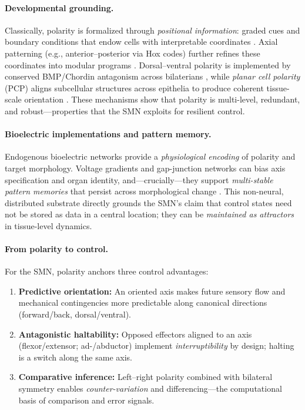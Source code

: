 \paragraph{Developmental grounding.}
Classically, polarity is formalized through \emph{positional information}: graded cues and boundary conditions that endow cells with interpretable coordinates \cite{Wolpert1969PositionalInformation}.
Axial patterning (e.g., anterior--posterior via Hox codes) further refines these coordinates into modular programs \cite{McGinnisKrumlauf1992Hox}.
Dorsal--ventral polarity is implemented by conserved BMP/Chordin antagonism across bilaterians \cite{DeRobertisSasai1996CommonPlan}, while \emph{planar cell polarity} (PCP) aligns subcellular structures across epithelia to produce coherent tissue-scale orientation \cite{GoodrichStrutt2011PCP}.
These mechanisms show that polarity is multi-level, redundant, and robust---properties that the SMN exploits for resilient control.

\paragraph{Bioelectric implementations and pattern memory.}
Endogenous bioelectric networks provide a \emph{physiological encoding} of polarity and target morphology.
Voltage gradients and gap-junction networks can bias axis specification and organ identity, and---crucially---they support \emph{multi-stable pattern memories} that persist across morphological change \cite{Levin2012MorphogeneticFields,Levin2014MolecularBioelectricity}.
This non-neural, distributed substrate directly grounds the SMN's claim that control states need not be stored as data in a central location; they can be \emph{maintained as attractors} in tissue-level dynamics.

\paragraph{From polarity to control.}
For the SMN, polarity anchors three control advantages:
\begin{enumerate}
    \item \textbf{Predictive orientation:} An oriented axis makes future sensory flow and mechanical contingencies more predictable along canonical directions (forward/back, dorsal/ventral).
    \item \textbf{Antagonistic haltability:} Opposed effectors aligned to an axis (flexor/extensor; ad-/abductor) implement \emph{interruptibility} by design; halting is a switch along the same axis.
    \item \textbf{Comparative inference:} Left--right polarity combined with bilateral symmetry enables \emph{counter-variation} and differencing---the computational basis of comparison and error signals.
\end{enumerate}

